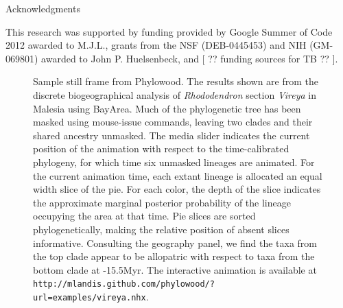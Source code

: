 \documentclass[11pt]{article}
\begin{document}
\bigskip

\begin{center}
{\sc Acknowledgments}
\end{center}

This research was supported by funding provided by Google Summer of Code 2012 awarded to M.J.L., grants from the NSF (DEB-0445453) and NIH (GM-069801) awarded to John P. Huelsenbeck, and [ ?? funding sources for TB ?? ].



\newpage

\newpage

\begin{figure}
\begin{center}
\caption{
Sample still frame from Phylowood. The results shown are from the discrete biogeographical analysis of {\it Rhododendron} section {\it Vireya} in Malesia using BayArea. Much of the phylogenetic tree has been masked using mouse-issue commands, leaving two clades and their shared ancestry unmasked. The media slider indicates the current position of the animation with respect to the time-calibrated phylogeny, for which time six unmasked lineages are animated.  For the current animation time, each extant lineage is allocated an equal width slice of the pie. For each color, the depth of the slice indicates the approximate marginal posterior probability of the lineage occupying the area at that time. Pie slices are sorted phylogenetically, making the relative position of absent slices informative. Consulting the geography panel, we find the taxa from the top clade appear to be allopatric with respect to taxa from the bottom clade at -15.5Myr. The interactive animation is available at \texttt{http://mlandis.github.com/phylowood/?url=examples/vireya.nhx}.
}

\end{center}
\end{figure}
\end{document}
